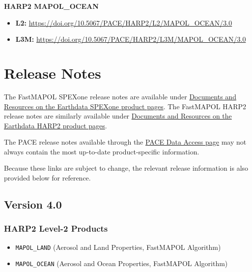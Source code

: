 \documentclass[
  11pt,
  letterpaper,
]{scrreprt}
\providecommand{\tightlist}{%
  \setlength{\itemsep}{0pt}\setlength{\parskip}{0pt}}
\begin{document}
\textbf{HARP2 MAPOL\_OCEAN}

\begin{itemize}
\tightlist
\item
  \textbf{L2:}
  \url{https://doi.org/10.5067/PACE/HARP2/L2/MAPOL_OCEAN/3.0}
\item
  \textbf{L3M:}
  \url{https://doi.org/10.5067/PACE/HARP2/L3M/MAPOL_OCEAN/3.0}
\end{itemize}


\chapter*{Release Notes}\label{release-notes}


The FastMAPOL SPEXone release notes are available under
\href{https://www.earthdata.nasa.gov/data/catalog/ob-cloud-pace-spexone-l2-mapol-ocean-4.0\#documents-and-resources}{Documents
and Resources on the Earthdata SPEXone product pages}. The FastMAPOL
HARP2 release notes are similarly available under
\href{https://www.earthdata.nasa.gov/data/catalog/ob-cloud-pace-harp2-l2-mapol-ocean-4.0\#documents-and-resources}{Documents
and Resources on the Earthdata HARP2 product pages}.

The PACE release notes available through the
\href{https://pace.oceansciences.org/access_pace_data.htm}{PACE Data
Access page} may not always contain the most up-to-date product-specific
information.

Because these links are subject to change, the relevant release
information is also provided below for reference.

\section*{Version 4.0}\label{version-4.0-1}


\subsection*{HARP2 Level-2 Products}\label{harp2-level-2-products}

\begin{itemize}
\item
  \texttt{MAPOL\_LAND} (Aerosol and Land Properties, FastMAPOL
  Algorithm)
\item
  \texttt{MAPOL\_OCEAN} (Aerosol and Ocean Properties, FastMAPOL
  Algorithm)
\end{itemize}
\end{document}
